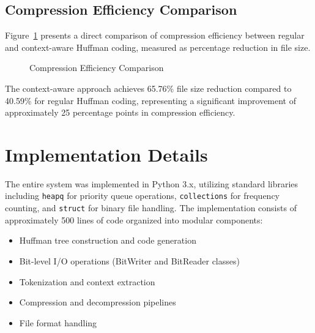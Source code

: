 \documentclass[conference]{IEEEtran}
\begin{document}
\subsection{Compression Efficiency Comparison}
Figure~\ref{fig:efficiency} presents a direct comparison of compression efficiency between regular and context-aware Huffman coding, measured as percentage reduction in file size.

\begin{figure}[htbp]
\centering
{}
\caption{Compression Efficiency Comparison}
\label{fig:efficiency}
\end{figure}

The context-aware approach achieves 65.76\% file size reduction compared to 40.59\% for regular Huffman coding, representing a significant improvement of approximately 25 percentage points in compression efficiency.

\section{Implementation Details}
The entire system was implemented in Python 3.x, utilizing standard libraries including \texttt{heapq} for priority queue operations, \texttt{collections} for frequency counting, and \texttt{struct} for binary file handling. The implementation consists of approximately 500 lines of code organized into modular components:

\begin{itemize}
\item Huffman tree construction and code generation
\item Bit-level I/O operations (BitWriter and BitReader classes)
\item Tokenization and context extraction
\item Compression and decompression pipelines
\item File format handling
\end{itemize}
\end{document}
